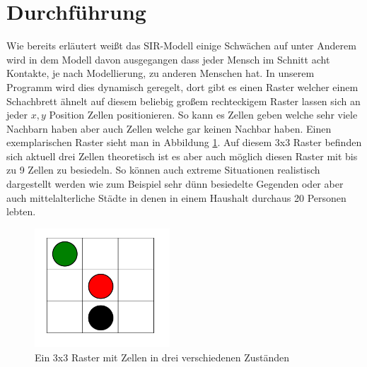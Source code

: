 \section*{Durchführung}
Wie bereits erläutert weißt das SIR-Modell einige Schwächen auf unter Anderem wird in dem Modell davon ausgegangen dass jeder Mensch im Schnitt acht Kontakte, je nach Modellierung, zu anderen Menschen hat. In unserem Programm wird dies dynamisch geregelt, dort gibt es einen Raster welcher einem Schachbrett ähnelt auf diesem beliebig großem rechteckigem \glqq{}Raster\grqq{} lassen sich an jeder $ x,y $ Position Zellen positionieren. So kann es Zellen geben welche sehr viele Nachbarn haben aber auch Zellen welche gar keinen Nachbar haben. Einen exemplarischen Raster sieht man in  Abbildung \ref{fig:Raster}. Auf diesem 3x3 Raster befinden sich aktuell drei Zellen theoretisch ist es aber auch möglich diesen Raster mit bis zu 9 Zellen zu besiedeln. So können auch extreme Situationen realistisch dargestellt werden wie zum Beispiel sehr dünn besiedelte Gegenden oder aber auch mittelalterliche Städte in denen in einem Haushalt durchaus 20 Personen lebten.\\


\begin{figure}[t]
\centering
\includegraphics[width= 0.45\textwidth]{./images/nachbarn.png}
\caption{Ein 3x3 Raster mit Zellen in drei verschiedenen Zuständen}
\label{fig:Raster}
\end{figure}

